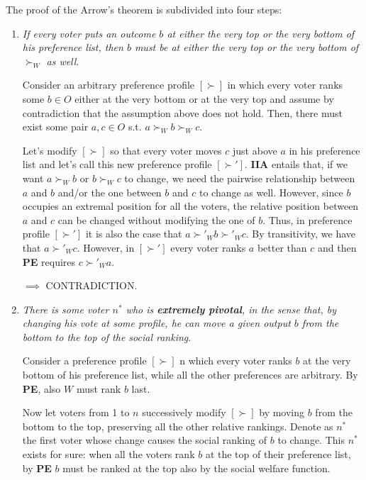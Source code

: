 \noindent The proof of the Arrow's theorem is subdivided into four steps:
\begin{enumerate}
	\item \textit{If every voter puts an outcome $b$ at either the very top or 
	the very bottom of his preference list, then $b$ must be at either the very 
	top or the very bottom of $\succ_W$ as well}.

	\noindent Consider an arbitrary preference profile $[\succ]$ in which every 
	voter ranks some $b \in O$ either at the very bottom or at the very top and 
	assume by contradiction that the assumption above does not hold. Then, there 
	must exist some pair $a,c \in O$ s.t. $a \succ_W b \succ_W c$.

	\noindent Let's modify $[\succ]$ so that every voter moves $c$ just above 
	$a$ in his preference list and let's call this new preference profile 
	$[\succ']$. \textbf{IIA} entails that, if we want $a \succ_W b$ or $b 
	\succ_W c$ to change, we need the pairwise relationship between $a$ and $b$ 
	and/or the one between $b$ and $c$ to change as well. However, since $b$ 
	occupies an extremal position for all the voters, the relative position 
	between $a$ and $c$ can be changed without modifying the one of $b$. Thus, 
	in preference profile $[\succ']$ it is also the case that $a \succ'_W b 
	\succ'_W c$. By transitivity, we have that $a \succ'_W c$. However, in 
	$[\succ']$ every voter ranks $a$ better than $c$ and then \textbf{PE} 
	requires $c \succ'_W a$.

	\noindent $\implies$ CONTRADICTION.

	\item \textit{There is some voter $n^*$ who is \textbf{extremely pivotal}, 
	in the sense that, by changing his vote at some profile, he can move a 
	given output $b$ from the bottom to the top of the social ranking}.

	\noindent Consider a preference profile $[\succ]$ n which every voter ranks 
	$b$ at the very bottom of his preference list, while all the other 
	preferences are arbitrary. By \textbf{PE}, also $W$ must rank $b$ last.

	\noindent Now let voters from 1 to $n$ successively modify $[\succ]$ by 
	moving $b$ from the bottom to the top, preserving all the other relative 
	rankings. Denote as $n^*$ the first voter whose change causes the social 
	ranking of $b$ to change. This $n^*$ exists for sure: when all the voters 
	rank $b$ at the top of their preference list, by \textbf{PE} $b$ must be 
	ranked at the top also by the social welfare function.


\end{enumerate}
